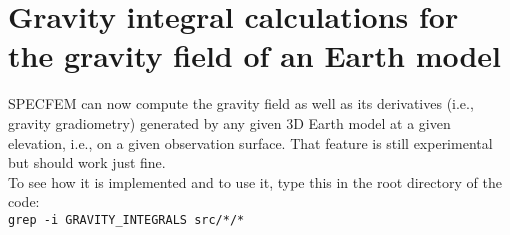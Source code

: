 \chapter{Gravity integral calculations for the gravity field of an Earth model}


SPECFEM can now compute the gravity field as well as its derivatives (i.e., gravity gradiometry)
generated by any given 3D Earth model at a given elevation, i.e., on a given observation surface.
That feature is still experimental but should work just fine.\\

To see how it is implemented and to use it, type this in the root directory of the code:\\

\texttt{grep -i GRAVITY\_INTEGRALS src/*/*}

